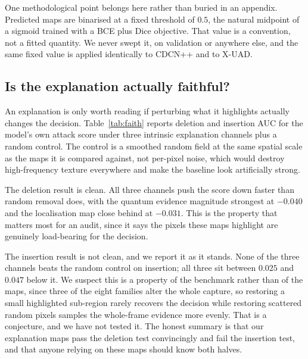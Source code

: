 \documentclass[conference]{IEEEtran}
\begin{document}
One methodological point belongs here rather than buried in an appendix. Predicted
maps are binarised at a fixed threshold of $0.5$, the natural midpoint of a sigmoid
trained with a BCE plus Dice objective. That value is a convention, not a fitted
quantity. We never swept it, on validation or anywhere else, and the same fixed value
is applied identically to CDCN++ and to X-UAD.

\subsection{Is the explanation actually faithful?}
An explanation is only worth reading if perturbing what it highlights actually
changes the decision. Table~\ref{tab:faith} reports deletion and insertion AUC
\cite{petsiuk2018rise} for the model's own attack score under three intrinsic
explanation channels plus a random control. The control is a smoothed random field at
the same spatial scale as the maps it is compared against, not per-pixel noise, which
would destroy high-frequency texture everywhere and make the baseline look
artificially strong.

\begin{table}[t]
\centering
\caption{Faithfulness of the three intrinsic explanation channels, measured against
the model's own attack score.}
\label{tab:faith}
\footnotesize
\resizebox{\linewidth}{!}{}
\end{table}

The deletion result is clean. All three channels push the score down faster than
random removal does, with the quantum evidence magnitude strongest at $-0.040$ and
the localisation map close behind at $-0.031$. This is the property that matters most
for an audit, since it says the pixels these maps highlight are genuinely
load-bearing for the decision.

The insertion result is not clean, and we report it as it stands. None of the three
channels beats the random control on insertion; all three sit between $0.025$ and
$0.047$ below it. We suspect this is a property of the benchmark rather than of the
maps, since three of the eight families alter the whole capture, so restoring a small
highlighted sub-region rarely recovers the decision while restoring scattered random
pixels samples the whole-frame evidence more evenly. That is a conjecture, and we
have not tested it. The honest summary is that our explanation maps pass the deletion
test convincingly and fail the insertion test, and that anyone relying on these maps
should know both halves.
\end{document}
